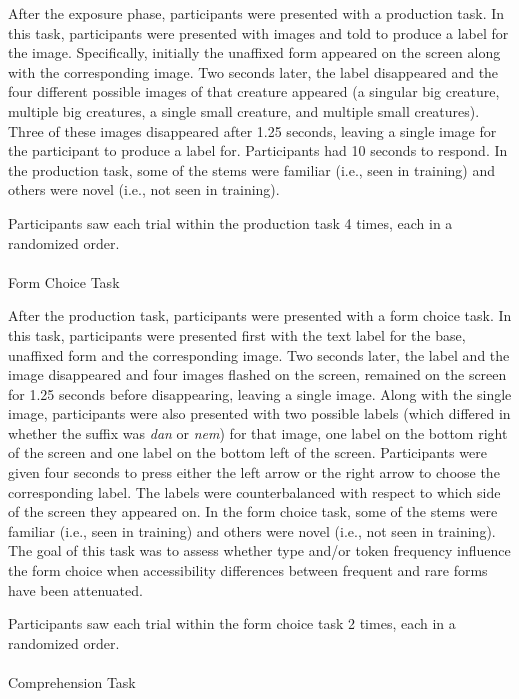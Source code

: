 \documentclass[
  letterpaper,
  DIV=11,
  numbers=noendperiod]{scrartcl}
\makeatletter
\let\oldparagraph\paragraph
\renewcommand{\paragraph}{
    \@ifstar
      \xxxParagraphStar
      \xxxParagraphNoStar
  }
\newcommand{\xxxParagraphStar}[1]{\oldparagraph*{#1}\mbox{}}
\newcommand{\xxxParagraphNoStar}[1]{\oldparagraph{#1}\mbox{}}
\makeatother
\begin{document}
After the exposure phase, participants were presented with a production
task. In this task, participants were presented with images and told to
produce a label for the image. Specifically, initially the unaffixed
form appeared on the screen along with the corresponding image. Two
seconds later, the label disappeared and the four different possible
images of that creature appeared (a singular big creature, multiple big
creatures, a single small creature, and multiple small creatures). Three
of these images disappeared after 1.25 seconds, leaving a single image
for the participant to produce a label for. Participants had 10 seconds
to respond. In the production task, some of the stems were familiar
(i.e., seen in training) and others were novel (i.e., not seen in
training).

Participants saw each trial within the production task 4 times, each in
a randomized order.

\paragraph{Form Choice Task}\label{form-choice-task}

After the production task, participants were presented with a form
choice task. In this task, participants were presented first with the
text label for the base, unaffixed form and the corresponding image. Two
seconds later, the label and the image disappeared and four images
flashed on the screen, remained on the screen for 1.25 seconds before
disappearing, leaving a single image. Along with the single image,
participants were also presented with two possible labels (which
differed in whether the suffix was \emph{dan} or \emph{nem}) for that
image, one label on the bottom right of the screen and one label on the
bottom left of the screen. Participants were given four seconds to press
either the left arrow or the right arrow to choose the corresponding
label. The labels were counterbalanced with respect to which side of the
screen they appeared on. In the form choice task, some of the stems were
familiar (i.e., seen in training) and others were novel (i.e., not seen
in training). The goal of this task was to assess whether type and/or
token frequency influence the form choice when accessibility differences
between frequent and rare forms have been attenuated.

Participants saw each trial within the form choice task 2 times, each in
a randomized order.

\paragraph{Comprehension Task}\label{comprehension-task}
\end{document}
